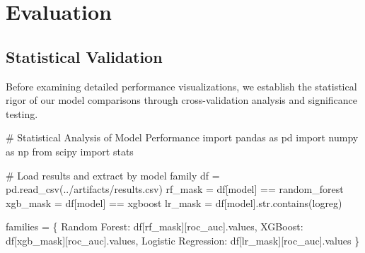 \documentclass[
  letterpaper,
  DIV=11,
  numbers=noendperiod]{scrartcl}
\newenvironment{Shaded}{\begin{snugshade}}{\end{snugshade}}
\newcommand{\BuiltInTok}[1]{\textcolor[rgb]{0.00,0.23,0.31}{#1}}
\newcommand{\CommentTok}[1]{\textcolor[rgb]{0.37,0.37,0.37}{#1}}
\newcommand{\ImportTok}[1]{\textcolor[rgb]{0.00,0.46,0.62}{#1}}
\newcommand{\NormalTok}[1]{\textcolor[rgb]{0.00,0.23,0.31}{#1}}
\newcommand{\OperatorTok}[1]{\textcolor[rgb]{0.37,0.37,0.37}{#1}}
\newcommand{\StringTok}[1]{\textcolor[rgb]{0.13,0.47,0.30}{#1}}
\renewenvironment{Shaded}{%
  \begin{tcolorbox}[%
    enhanced,%
    colback=codebg,%
    colframe=codebg,%
    borderline west={3pt}{0pt}{sectionblue},%
    fontupper=\small\ttfamily,%
    boxrule=0pt,%
    arc=0pt,%
    boxsep=5pt,%
    left=2mm,%
    right=2mm,%
    top=2mm,%
    bottom=2mm%
  ]%
}{%
  \end{tcolorbox}%
}
\begin{document}
\section{Evaluation}\label{evaluation}

\subsection{Statistical Validation}\label{statistical-validation}

Before examining detailed performance visualizations, we establish the
statistical rigor of our model comparisons through cross-validation
analysis and significance testing.

\begin{Shaded}
\begin{Highlighting}[]


\CommentTok{\# Statistical Analysis of Model Performance}
\ImportTok{import}\NormalTok{ pandas }\ImportTok{as}\NormalTok{ pd}
\ImportTok{import}\NormalTok{ numpy }\ImportTok{as}\NormalTok{ np}
\ImportTok{from}\NormalTok{ scipy }\ImportTok{import}\NormalTok{ stats}

\CommentTok{\# Load results and extract by model family}
\NormalTok{df }\OperatorTok{=}\NormalTok{ pd.read\_csv(}\StringTok{\textquotesingle{}../artifacts/results.csv\textquotesingle{}}\NormalTok{)}
\NormalTok{rf\_mask }\OperatorTok{=}\NormalTok{ df[}\StringTok{\textquotesingle{}model\textquotesingle{}}\NormalTok{] }\OperatorTok{==} \StringTok{\textquotesingle{}random\_forest\textquotesingle{}}
\NormalTok{xgb\_mask }\OperatorTok{=}\NormalTok{ df[}\StringTok{\textquotesingle{}model\textquotesingle{}}\NormalTok{] }\OperatorTok{==} \StringTok{\textquotesingle{}xgboost\textquotesingle{}}  
\NormalTok{lr\_mask }\OperatorTok{=}\NormalTok{ df[}\StringTok{\textquotesingle{}model\textquotesingle{}}\NormalTok{].}\BuiltInTok{str}\NormalTok{.contains(}\StringTok{\textquotesingle{}logreg\textquotesingle{}}\NormalTok{)}

\NormalTok{families }\OperatorTok{=}\NormalTok{ \{}
    \StringTok{\textquotesingle{}Random Forest\textquotesingle{}}\NormalTok{: df[rf\_mask][}\StringTok{\textquotesingle{}roc\_auc\textquotesingle{}}\NormalTok{].values,}
    \StringTok{\textquotesingle{}XGBoost\textquotesingle{}}\NormalTok{: df[xgb\_mask][}\StringTok{\textquotesingle{}roc\_auc\textquotesingle{}}\NormalTok{].values,}
    \StringTok{\textquotesingle{}Logistic Regression\textquotesingle{}}\NormalTok{: df[lr\_mask][}\StringTok{\textquotesingle{}roc\_auc\textquotesingle{}}\NormalTok{].values}
\NormalTok{\}}


\end{Highlighting}
\end{Shaded}
\end{document}

